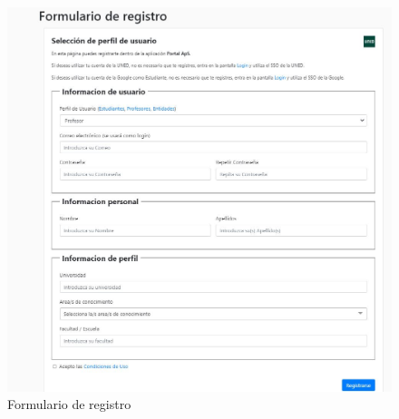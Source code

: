 \documentclass[11pt]{book}
\begin{document}
\begin{figure}[t]
	\centering
	\includegraphics[scale=0.7]{registro}
	\caption{Formulario de registro}
\end{figure}
\end{document}

